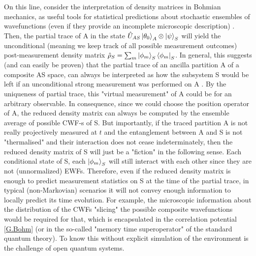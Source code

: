 \documentclass[11pt, a4paper]{article} %
\begin{document}
On this line, consider the interpretation of density matrices in Bohmian mechanics, as useful tools for statistical predictions about stochastic ensembles of wavefunctions (even if they provide an incomplete microscopic description) \cite{density, operatorsObservables}. Then, the partial trace of A in the state $\hat{U}_{AS}\ket{\theta_0}_A\otimes\ket{\psi}_S$ will yield the unconditional (meaning we keep track of all possible measurement outcomes) post-measurement density matrix $\hat{\rho}_S=\sum_m \ket{\phi_m}_S\bra{\phi_m}_S$. In general, this suggests (and can easily be proven) that the partial trace of an ancilla partition A of a composite AS space, can always be interpreted as how the subsystem S would be left if an unconditional strong measurement was performed on A \cite{Generalized}. By the uniqueness of partial trace, this "virtual measurement" of A could be for an arbitrary observable. In consequence, since we could choose the position operator of A, the reduced density matrix can always be computed by the ensemble average of possible CWF-s of S. But importantly, if the traced partition A is not really projectively measured at $t$ and the entanglement between A and S is not "thermalised" and their interaction does not cease indeterminately, then the reduced density matrix of S will just be a "fiction" in the following sense. Each conditional state of S, each $\ket{\phi_m}_S$ will still interact with each other since they are not (unnormalized) EWFs. Therefore, even if the reduced density matrix is enough to predict measurement statistics on S at the time of the partial trace, in typical (non-Markovian) scenarios it will not convey enough information to locally predict its time evolution. For example, the microscopic information about the distribution of the CWFs "slicing" the possible composite wavefunctions would be required for that, which is encapsulated in the correlation potential \eqref{G.Bohm} (or in the so-called "memory time superoperator" \cite{WisemanSSE} of the standard quantum theory). To know this without explicit simulation of the environment is the challenge of open quantum systems.\vspace{-0.25cm}
\end{document}
